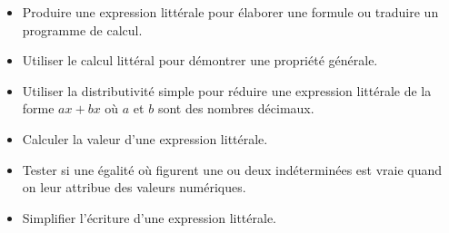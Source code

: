 \documentclass[a4paper,12pt,fleqn]{article}
\begin{document}
\begin{itemize}																								
	\item {}	Produire une expression littérale pour élaborer une formule ou traduire un programme de calcul.																								
	\item {}	Utiliser le calcul littéral pour démontrer une propriété générale.																								
	\item {}	Utiliser la distributivité simple pour réduire une expression littérale de la forme $ax + bx$ où $a$ et $b$ sont des nombres décimaux.																								
	\item {}	Calculer la valeur d’une expression littérale.																								
	\item {}	Tester si une égalité où figurent une ou deux indéterminées est vraie quand on leur attribue des valeurs numériques.						
	\item {}	Simplifier l'écriture d'une expression littérale. %
\end{itemize}
\end{document}
